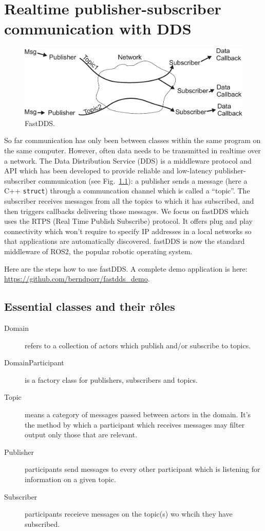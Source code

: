 \documentclass[12pt]{report}
\begin{document}
\chapter{Realtime publisher-subscriber communication with DDS}

\begin{figure}[h]
\begin{center}
\includegraphics[width=\linewidth]{fastdds1}
\end{center}
\caption{FastDDS.\label{dds1}}
\end{figure}

So far communication has only been between classes within the same
program on the same computer. However, often data needs to be
transmitted in realtime over a network. The Data Distribution Service
(DDS) is a middleware protocol and API which has been developed to
provide reliable and low-latency publisher-subscriber communication
(see Fig.~\ref{dds1}): a publisher sends a message (here a
C++ \texttt{struct}) through a communcation channel which is called a ``topic''.
The subscriber receives messages from all the topics to which
it has subscribed, and then triggers callbacks
delivering those messages.  We focus on fastDDS which uses the
RTPS (Real Time Publish Subscribe) protocol. It offers plug and play
connectivity which won't require to specify IP addresses in a local
networks so that applications are automatically discovered. fastDDS is
now the standard middleware of ROS2, the popular robotic operating
system.

Here are the steps how to use fastDDS. A complete demo application is here: \url{https://github.com/berndporr/fastdds_demo}.

\section{Essential classes and their r\^oles}

\begin{description}
 \item[Domain] refers to a collection of actors which publish and/or subscribe to topics.
 \item[DomainParticipant] is a factory class for publishers, subscribers and topics.
 \item[Topic] means a category of messages passed between actors in the domain.
  It's the method by which a participant which receives messages may filter output
  only those that are relevant.
 \item[Publisher] participants send messages to every other participant
  which is listening for information on a given topic.
 \item[Subscriber] participants receieve messages on the topic(s) wo whcih they have
  subscribed.
\end{description}
\end{document}

